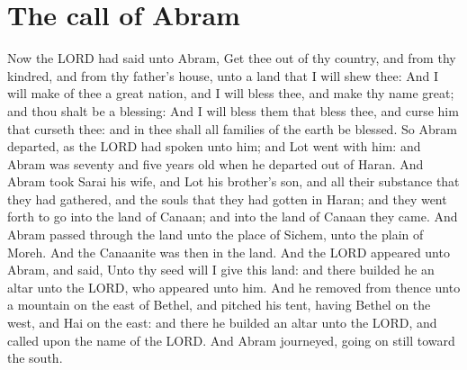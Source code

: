 \section*{The call of Abram}
\begin{biblechapter} %
\verse Now the LORD had said unto Abram, Get thee out of thy country, and from thy kindred, and from thy father's house, unto a land that I will shew thee:
\verse And I will make of thee a great nation, and I will bless thee, and make thy name great; and thou shalt be a blessing:
\verse And I will bless them that bless thee, and curse him that curseth thee: and in thee shall all families of the earth be blessed.
\verse So Abram departed, as the LORD had spoken unto him; and Lot went with him: and Abram was seventy and five years old when he departed out of Haran.
\verse And Abram took Sarai his wife, and Lot his brother's son, and all their substance that they had gathered, and the souls that they had gotten in Haran; and they went forth to go into the land of Canaan; and into the land of Canaan they came.
\verse And Abram passed through the land unto the place of Sichem, unto the plain of Moreh. And the Canaanite was then in the land.
\verse And the LORD appeared unto Abram, and said, Unto thy seed will I give this land: and there builded he an altar unto the LORD, who appeared unto him.
\verse And he removed from thence unto a mountain on the east of Bethel, and pitched his tent, having Bethel on the west, and Hai on the east: and there he builded an altar unto the LORD, and called upon the name of the LORD.
\verse And Abram journeyed, going on still toward the south.

\end{biblechapter}

